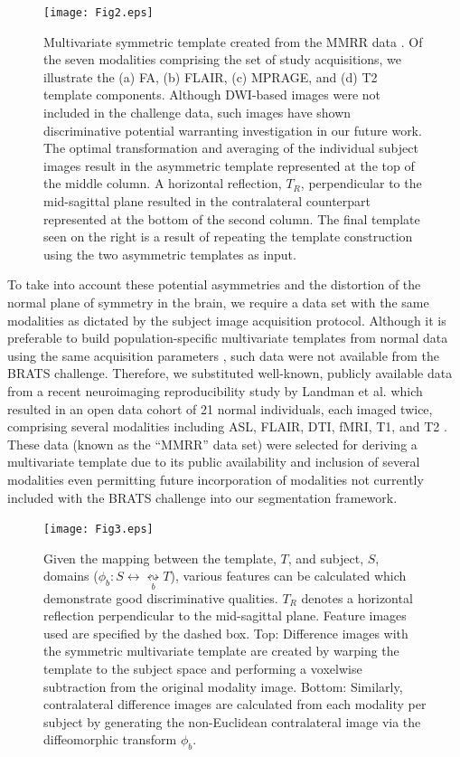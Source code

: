 \begin{figure}
    \centerline{\texttt{[image: Fig2.eps]}}
  \caption{Multivariate symmetric template created from the MMRR 
           data \citep{landman2011}.  Of the seven modalities 
           comprising the set of study acquisitions, we illustrate the
           (a) FA, (b) FLAIR, (c) MPRAGE, and (d) T2 template components.
           Although DWI-based images were not included in the challenge data, 
           such images have shown discriminative potential \citep{price2003,cha2005} 
           warranting investigation in our future work.  
           The optimal transformation and averaging of the individual 
           subject images result in the asymmetric template represented at 
           the top of the middle column.  A horizontal reflection, $T_R$,
           perpendicular to the mid-sagittal plane  resulted in the 
           contralateral counterpart represented
           at the bottom of the second column.  The final template seen on
           the right is a result of repeating the template construction using
           the two asymmetric templates as input.
          }
  \label{fig:symmetrictemplates}
\end{figure}


To take into account these potential asymmetries and the distortion of 
the normal plane of symmetry in the brain, we 
require a data set with the same modalities as dictated
by the subject image acquisition protocol.  Although it
is preferable to build population-specific multivariate
templates from normal data using the same acquisition 
parameters \citep{avants2010}, such data were not available
from the BRATS challenge.  Therefore, we substituted well-known,
publicly available data from a recent neuroimaging reproducibility study
by Landman et al. which resulted in an open data cohort of 21
normal individuals, each imaged twice, comprising several
modalities including ASL, FLAIR, DTI, fMRI, T1, and T2 
\citep{landman2011}.  These data (known as the
``MMRR'' data set) were selected for deriving
a multivariate template due to its public availability and
inclusion of several modalities even permitting future 
incorporation of modalities 
not currently included with the BRATS challenge into our 
segmentation framework.  


\begin{figure}
  \centering
    \texttt{[image: Fig3.eps]}
  \caption{ Given the mapping between the template, $T$, and subject, $S$, domains ($\phi_b: S  \leftrightarrow \underset{b}{\leftrightsquigarrow} T$), various features can be calculated which demonstrate good discriminative qualities.  $T_R$ denotes a horizontal reflection
  perpendicular to the mid-sagittal plane.
  Feature images used are specified by the dashed box.
Top:  Difference images with the symmetric multivariate template are created by warping the template to the subject space and performing a voxelwise subtraction from the original modality image.
Bottom:  Similarly, contralateral difference images are calculated from each modality per subject by generating the non-Euclidean contralateral image via the diffeomorphic transform $\phi_b$.  
          }
  \label{fig:asymmetryFeatures}
\end{figure}


